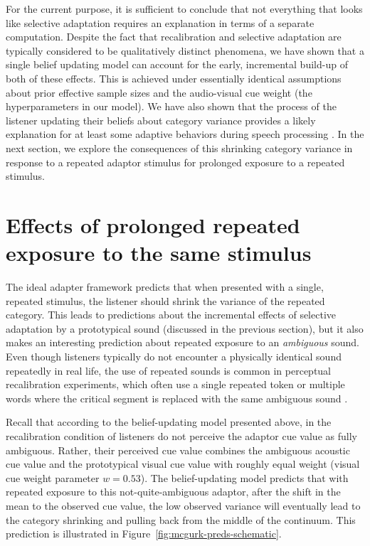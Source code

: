 \label{r1-computation-mechanism}
For the current purpose, it is sufficient to conclude that not everything that looks like selective adaptation requires an explanation in terms of a separate computation.
Despite the fact that recalibration and selective adaptation are typically considered to be qualitatively distinct phenomena, we have shown that a single belief updating model  can account for the early, incremental build-up of both of these effects.  This is achieved under essentially identical assumptions about prior effective sample sizes and the audio-visual cue weight (the hyperparameters in our model).  We have also shown that the process of the listener updating their beliefs about category variance provides a likely explanation for at least some adaptive behaviors during speech processing \autocite[see also][]{Clayards2008}.
In the next section, we explore the consequences of this shrinking category variance in response to a repeated adaptor stimulus for prolonged exposure to a repeated stimulus.



\section{Effects of prolonged repeated exposure to the same stimulus}
\label{sec:effects-long-term}


The ideal adapter framework predicts that when presented with a single, repeated stimulus, the listener should shrink the variance of the repeated category.  This leads to predictions about the incremental effects of selective adaptation by a prototypical sound (discussed in the previous section), but it also makes an interesting prediction about repeated exposure to an \emph{ambiguous} sound.  Even though listeners typically do not encounter a physically identical sound repeatedly in real life, the use of repeated sounds is common in perceptual recalibration experiments, which often use a single repeated token \autocite[e.g.,][]{Bertelson2003,Vroomen2004} or multiple words where the critical segment is replaced with the same ambiguous sound \autocites[e.g.,][]{Norris2003,Samuel2001}[but see][]{Kraljic2005,Reinisch2014}.

Recall that according to the belief-updating model presented above, in the recalibration condition of  listeners do not perceive the adaptor cue value as fully ambiguous.  Rather, their perceived cue value combines the ambiguous acoustic cue value and the prototypical visual cue value with roughly equal weight (visual cue weight parameter $w=0.53$).  The belief-updating model predicts that with repeated exposure to this not-quite-ambiguous adaptor, after the shift in the mean to the observed cue value, the low observed variance will eventually lead to the category shrinking and pulling back from the middle of the continuum. This prediction is illustrated in Figure~\ref{fig:mcgurk-preds-schematic}.

